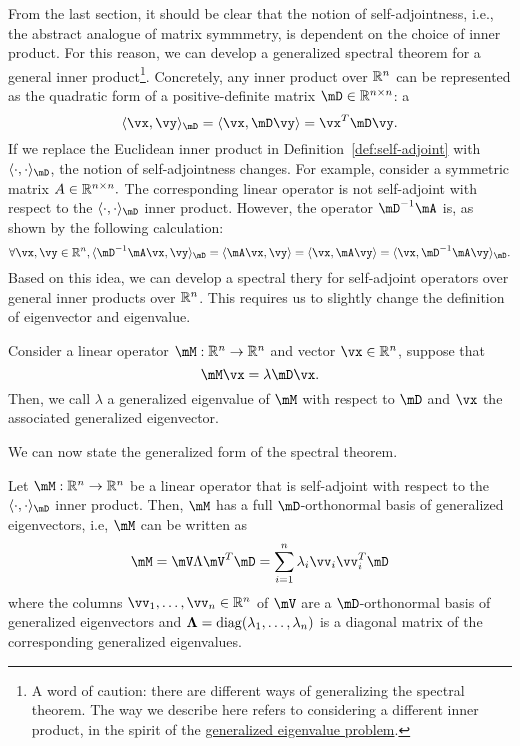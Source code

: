 From the last section, it should be clear that the notion of self-adjointness, i.e., the abstract analogue of matrix symmmetry, is dependent on the choice of inner product. For this reason, we can develop a generalized spectral theorem for a general inner product\footnote{A word of caution: there are different ways of generalizing the spectral theorem. The way we describe here refers to considering a different inner product, in the spirit of the \href{https://en.wikipedia.org/wiki/Eigendecomposition_of_a_matrix#Generalized_eigenvalue_problem}{generalized eigenvalue problem}.}. Concretely, any inner product over $\mathbb{R}^n$ can be represented as the quadratic form of a positive-definite matrix $\mD \in \R^{n \times n}$\cite{}:
a
$$
\langle \vx, \vy \rangle_{\mD} = \langle \vx, \mD \vy \rangle = \vx^T \mD \vy.
$$
If we replace the Euclidean inner product in Definition~\ref{def:self-adjoint} with 
$\langle \cdot, \cdot \rangle_{\mD}$, the notion of self-adjointness changes. For example, consider a symmetric matrix $A \in \mathbb{R}^{n \times n}.$ The corresponding linear operator is not self-adjoint with respect to the $\langle \cdot, \cdot \rangle_{\mD}$ inner product. However, the operator $\mD^{-1} \mA$ is, as shown by the following calculation:
$$
\forall \vx,\vy \in \R^n, \langle \mD^{-1} \mA \vx , \vy \rangle_{\mD} = \langle \mA \vx , \vy \rangle = \langle  \vx , \mA \vy \rangle = \langle \vx , \mD^{-1} \mA \vy \rangle_{\mD}.
$$
Based on this idea, we can develop a spectral thery for self-adjoint operators over general inner products over $\mathbb{R}^n$. This requires us to slightly change the definition of eigenvector and eigenvalue.
\begin{definition}
Consider a linear operator $\mM: \R^{n} \to \R^{n}$ and  vector $\vx \in \R^n$, suppose that
$$  
\mM\vx = \lambda \mD \vx.
$$
Then, we call  $\lambda$ a \textrm{ generalized eigenvalue} of $\mM$ with respect to $\mD$ and $\vx$ the associated \textrm{generalized eigenvector}.
\end{definition}
%
We can now state the generalized form of the spectral theorem.

\begin{theorem}\label{thm:gen-spectral}
Let $\mM: \R^n \to \R^n$ be a linear operator that is self-adjoint with respect to the $\langle \cdot, \cdot \rangle_{\mD}$ inner product. Then, $\mM$ has a full $\mD$-orthonormal basis of generalized eigenvectors, i.e, $\mM$ can be written as
\begin{align}\label{eqn:geneigendecomp}
\mM = \mV \Lambda \mV^T \mD = \sum_{i=1}^{n} \lambda_i \vv_i \vv_i^T \mD
\end{align}
where the columns $\vv_1, \ldots, \vv_n \in \R^n$ of $\mV$ are a  $\mD$-orthonormal basis of generalized eigenvectors and $\mathbf{\Lambda}=\operatorname{diag}(\lambda_1, \ldots, \lambda_n)$ is a diagonal matrix of the corresponding generalized eigenvalues.
\end{theorem}  

